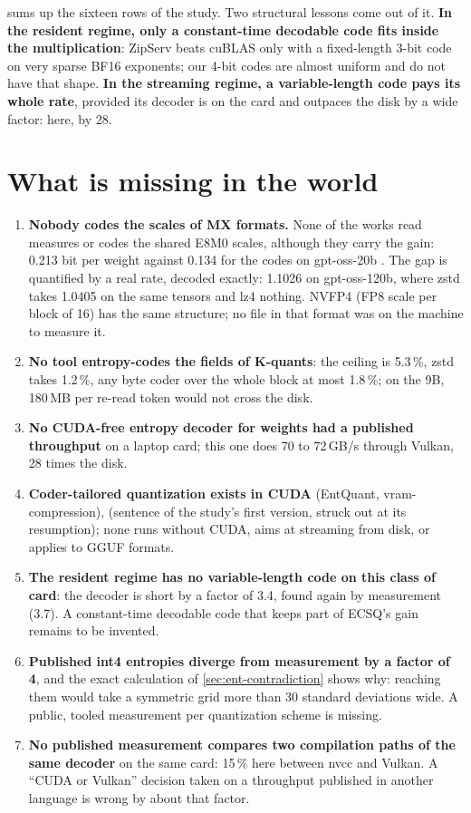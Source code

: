  sums up the sixteen rows of the study. Two structural lessons come out of it. \textbf{In the resident regime, only a constant-time decodable code fits inside the multiplication}: ZipServ beats cuBLAS only with a fixed-length 3-bit code on very sparse BF16 exponents; our 4-bit codes are almost uniform and do not have that shape. \textbf{In the streaming regime, a variable-length code pays its whole rate}, provided its decoder is on the card and outpaces the disk by a wide factor: here, by 28.

\section{What is missing in the world}\label{sec:ent-manque}

\begin{enumerate}
\item \textbf{Nobody codes the scales of MX formats.} None of the works read measures or codes the shared E8M0 scales, although they carry the gain: 0.213 bit per weight against 0.134 for the codes on gpt-oss-20b \calc. The gap is quantified by a real rate, decoded exactly: 1.1026 on gpt-oss-120b, where zstd takes 1.0405 on the same tensors and lz4 nothing. NVFP4 (FP8 scale per block of 16) has the same structure; no file in that format was on the machine to measure it.
\item \textbf{No tool entropy-codes the fields of K-quants}: the ceiling is 5.3\,\%, zstd takes 1.2\,\%, any byte coder over the whole block at most 1.8\,\%; on the 9B, 180\,MB per re-read token would not cross the disk.
\item \textbf{No CUDA-free entropy decoder for weights had a published throughput} on a laptop card; this one does 70 to 72\,GB/s through Vulkan, 28 times the disk.
\item \textbf{Coder-tailored quantization exists in CUDA} (EntQuant, vram-compression),  (sentence of the study's first version, struck out at its resumption); none runs without CUDA, aims at streaming from disk, or applies to GGUF formats.
\item \textbf{The resident regime has no variable-length code on this class of card}: the decoder is short by a factor of 3.4, found again by measurement (3.7). A constant-time decodable code that keeps part of ECSQ's gain remains to be invented.
\item \textbf{Published int4 entropies diverge from measurement by a factor of 4}, and the exact calculation of \cref{sec:ent-contradiction} shows why: reaching them would take a symmetric grid more than 30 standard deviations wide. A public, tooled measurement per quantization scheme is missing.
\item \textbf{No published measurement compares two compilation paths of the same decoder} on the same card: 15\,\% here between nvcc and Vulkan. A ``CUDA or Vulkan'' decision taken on a throughput published in another language is wrong by about that factor.
\end{enumerate}

